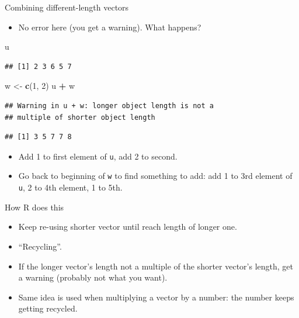 \documentclass[
  ignorenonframetext,
]{beamer}
\newenvironment{Shaded}{\begin{snugshade}}{\end{snugshade}}
\newcommand{\DecValTok}[1]{\textcolor[rgb]{0.00,0.00,0.81}{#1}}
\newcommand{\KeywordTok}[1]{\textcolor[rgb]{0.13,0.29,0.53}{\textbf{#1}}}
\newcommand{\NormalTok}[1]{#1}
\newcommand{\OperatorTok}[1]{\textcolor[rgb]{0.81,0.36,0.00}{\textbf{#1}}}
\newcommand{\StringTok}[1]{\textcolor[rgb]{0.31,0.60,0.02}{#1}}
\providecommand{\tightlist}{%
  \setlength{\itemsep}{0pt}\setlength{\parskip}{0pt}}
\begin{document}
\begin{frame}[fragile]{Combining different-length vectors}
\protect\hypertarget{combining-different-length-vectors}{}

\begin{itemize}
\tightlist
\item
  No error here (you get a warning). What happens?
\end{itemize}

\begin{Shaded}
\begin{Highlighting}[]
\NormalTok{u}
\end{Highlighting}
\end{Shaded}

\begin{verbatim}
## [1] 2 3 6 5 7
\end{verbatim}

\begin{Shaded}
\begin{Highlighting}[]
\NormalTok{w <-}\StringTok{ }\KeywordTok{c}\NormalTok{(}\DecValTok{1}\NormalTok{, }\DecValTok{2}\NormalTok{)}
\NormalTok{u }\OperatorTok{+}\StringTok{ }\NormalTok{w}
\end{Highlighting}
\end{Shaded}

\begin{verbatim}
## Warning in u + w: longer object length is not a
## multiple of shorter object length
\end{verbatim}

\begin{verbatim}
## [1] 3 5 7 7 8
\end{verbatim}

\begin{itemize}
\tightlist
\item
  Add 1 to first element of \texttt{u}, add 2 to second.
\item
  Go back to beginning of \texttt{w} to find something to add: add 1 to
  3rd element of \texttt{u}, 2 to 4th element, 1 to 5th.
\end{itemize}

\end{frame}

\begin{frame}{How R does this}
\protect\hypertarget{how-r-does-this}{}

\begin{itemize}
\tightlist
\item
  Keep re-using shorter vector until reach length of longer one.
\item
  ``Recycling''.
\item
  If the longer vector's length not a multiple of the shorter vector's
  length, get a warning (probably not what you want).
\item
  Same idea is used when multiplying a vector by a number: the number
  keeps getting recycled.
\end{itemize}

\end{frame}
\end{document}

